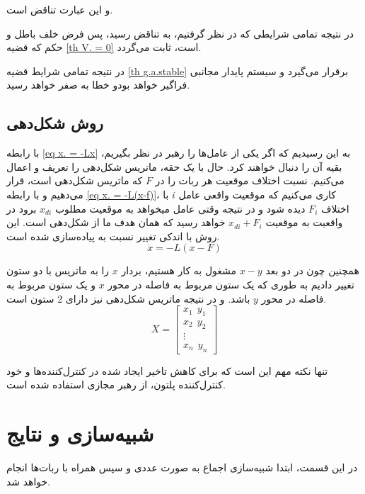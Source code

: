 و این عبارت تناقض است.

در نتیجه تمامی شرایطی که در نظر گرفتیم، به تناقض رسید، پس فرض خلف باطل و حکم که قضیه \ref{th V. = 0} است، ثابت می‌گردد.

در نتیجه تمامی شرایط قضیه \ref{th g.a.stable} برقرار می‌گیرد و سیستم پایدار مجانبی فراگیر خواهد بودو خطا به صفر خواهد رسید.

\subsection{روش شکل‌دهی}
با رابطه \ref{eq x. = -Lx} به این رسیدیم که اگر یکی از عامل‌ها را رهبر در نظر بگیریم، بقیه آن را دنبال خواهند کرد. حال با یک حقه، ماتریس شکل‌دهی را تعریف و اعمال می‌کنیم. نسبت اختلاف موقعیت هر ربات را در $F$ که ماتریس شکل‌دهی است، قرار می‌دهیم و با رابطه \ref{eq x. = -L(x-f)}، کاری می‌کنیم که موقعیت واقعی عامل $i$ با اختلاف $F_i$ دیده شود و در نتیجه وقتی عامل میخواهد به موقعیت مطلوب $x_{di}$ برود در واقعیت به موقعیت $x_{di} + F_i$ خواهد رسید که همان هدف ما از شکل‌دهی است. این روش با اندکی تغییر نسبت به \cite{jadbabaie2003coordination} پیاده‌سازی شده است.
\begin{equation}\label{eq x. = -L(x-f)}
	\dot{x} = -L(x-F)
\end{equation} 

همچنین چون در دو بعد $x-y$ مشغول به کار هستیم، بردار $x$ را به ماتریس با دو ستون تغییر دادیم به طوری که یک ستون مربوط به فاصله در محور $x$ و یک ستون مربوط به فاصله در محور $y$ باشد. و در نتیجه ماتریس شکل‌دهی نیز دارای 2 ستون است.
\begin{equation}\label{eq X = [x y]}
	X = 
	\begin{bmatrix}
	x_1~~ y_1 \\
	x_2~~ y_2 \\
	\vdots \\
	x_n ~~y_n
	\end{bmatrix}
\end{equation}

تنها نکته مهم این است که برای کاهش تاخیر ایجاد شده در کنترل‌کننده‌ها و خود کنترل‌کننده پلتون، از رهبر مجازی استفاده شده است.

\section{شبیه‌سازی و نتایج}
در این قسمت، ابتدا شبیه‌سازی اجماع به صورت عددی و سپس همراه با ربات‌ها انجام خواهد شد.

